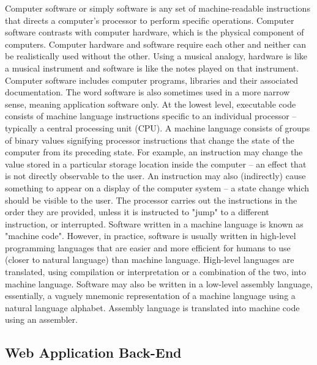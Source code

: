 Computer software or simply software is any set of machine-readable instructions that directs a computer's processor to perform specific operations. Computer software contrasts with computer hardware, which is the physical component of computers. Computer hardware and software require each other and neither can be realistically used without the other. Using a musical analogy, hardware is like a musical instrument and software is like the notes played on that instrument.
Computer software includes computer programs, libraries and their associated documentation. The word software is also sometimes used in a more narrow sense, meaning application software only.
At the lowest level, executable code consists of machine language instructions specific to an individual processor – typically a central processing unit (CPU). A machine language consists of groups of binary values signifying processor instructions that change the state of the computer from its preceding state. For example, an instruction may change the value stored in a particular storage location inside the computer – an effect that is not directly observable to the user. An instruction may also (indirectly) cause something to appear on a display of the computer system – a state change which should be visible to the user. The processor carries out the instructions in the order they are provided, unless it is instructed to "jump" to a different instruction, or interrupted.
Software written in a machine language is known as "machine code". However, in practice, software is usually written in high-level programming languages that are easier and more efficient for humans to use (closer to natural language) than machine language. High-level languages are translated, using compilation or interpretation or a combination of the two, into machine language. Software may also be written in a low-level assembly language, essentially, a vaguely mnemonic representation of a machine language using a natural language alphabet. Assembly language is translated into machine code using an assembler.


\subsection{Web Application Back-End}
